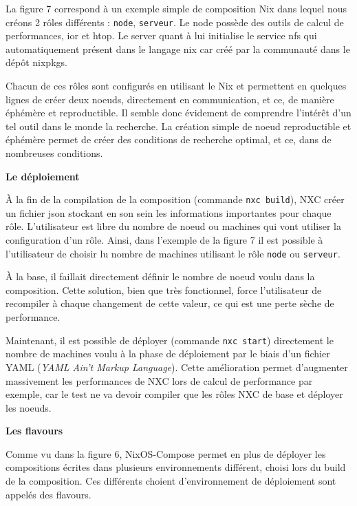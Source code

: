 \documentclass[a4paper,french,12pt, titlepage]{article}
\begin{document}
La figure 7 correspond à un exemple simple de composition Nix dans
lequel nous créons 2 rôles différents : \texttt{node}, \texttt{serveur}.
Le node possède des outils de calcul de performances, ior et htop. Le
server quant à lui initialise le service nfs qui automatiquement présent
dans le langage nix car créé par la communauté dans le dépôt
nixpkgs.\newline

Chacun de ces rôles sont configurés en utilisant le Nix et permettent en
quelques lignes de créer deux noeuds, directement en communication, et
ce, de manière éphémère et reproductible. Il semble donc évidement de
comprendre l'intérêt d'un tel outil dans le monde la recherche. La
création simple de noeud reproductible et éphémère permet de créer des
conditions de recherche optimal, et ce, dans de nombreuses
conditions.\newline

\textbf{Le déploiement}\newline

À la fin de la compilation de la composition (commande
\texttt{nxc\ build}), NXC créer un fichier json stockant en son sein les
informations importantes pour chaque rôle. L'utilisateur est libre du
nombre de noeud ou machines qui vont utiliser la configuration d'un
rôle. Ainsi, dans l'exemple de la figure 7 il est possible à
l'utilisateur de choisir lu nombre de machines utilisant le rôle
\texttt{node} ou \texttt{serveur}.\newline

À la base, il faillait directement définir le nombre de noeud voulu dans
la composition. Cette solution, bien que très fonctionnel, force
l'utilisateur de recompiler à chaque changement de cette valeur, ce qui
est une perte sèche de performance.\newline

Maintenant, il est possible de déployer (commande \texttt{nxc\ start})
directement le nombre de machines voulu à la phase de déploiement par le
biais d'un fichier YAML (\emph{YAML Ain't Markup Language}). Cette
amélioration permet d'augmenter massivement les performances de NXC lors
de calcul de performance par exemple, car le test ne va devoir compiler
que les rôles NXC de base et déployer les noeuds.\newline

\textbf{Les flavours}\newline

Comme vu dans la figure 6, NixOS-Compose permet en plus de déployer les
compositions écrites dans plusieurs environnements différent, choisi
lors du build de la composition. Ces différents choient d'environnement
de déploiement sont appelés des flavours.\newline
\end{document}
